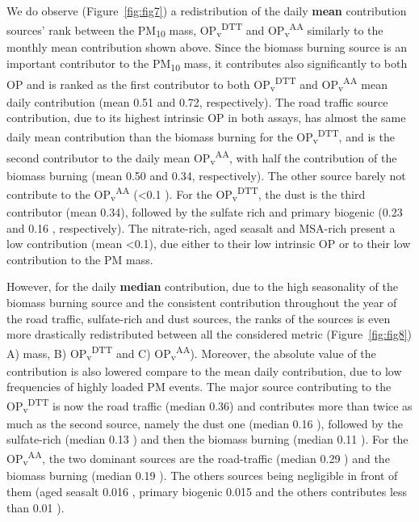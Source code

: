 \documentclass[
]{article}
\begin{document}
We do observe (Figure~\protect\hyperlink{fig:fig7}{{[}fig:fig7{]}}) a
redistribution of the daily \textbf{mean} contribution sources' rank
between the PM\textsubscript{10} mass,
OP\textsubscript{v}\textsuperscript{DTT} and
OP\textsubscript{v}\textsuperscript{AA} similarly to the monthly mean
contribution shown above. Since the biomass burning source is an
important contributor to the PM\textsubscript{10} mass, it contributes
also significantly to both OP and is ranked as the first contributor to
both OP\textsubscript{v}\textsuperscript{DTT} and
OP\textsubscript{v}\textsuperscript{AA} mean daily contribution (mean
0.51 and 0.72, respectively). The road traffic source contribution, due
to its highest intrinsic OP in both assays, has almost the same daily
mean contribution than the biomass burning for the
OP\textsubscript{v}\textsuperscript{DTT}, and is the second contributor
to the daily mean OP\textsubscript{v}\textsuperscript{AA}, with half the
contribution of the biomass burning (mean 0.50 and 0.34, respectively).
The other source barely not contribute to the
OP\textsubscript{v}\textsuperscript{AA} (\textless0.1 ). For the
OP\textsubscript{v}\textsuperscript{DTT}, the dust is the third
contributor (mean 0.34), followed by the sulfate rich and primary
biogenic (0.23 and 0.16 , respectively). The nitrate-rich, aged seasalt
and MSA-rich present a low contribution (mean \textless0.1), due either
to their low intrinsic OP or to their low contribution to the PM mass.

However, for the daily \textbf{median} contribution, due to the high
seasonality of the biomass burning source and the consistent
contribution throughout the year of the road traffic, sulfate-rich and
dust sources, the ranks of the sources is even more drastically
redistributed between all the considered metric
(Figure~\protect\hyperlink{fig:fig8}{{[}fig:fig8{]}}) A) mass, B)
OP\textsubscript{v}\textsuperscript{DTT} and C)
OP\textsubscript{v}\textsuperscript{AA}). Moreover, the absolute value
of the contribution is also lowered compare to the mean daily
contribution, due to low frequencies of highly loaded PM events. The
major source contributing to the
OP\textsubscript{v}\textsuperscript{DTT} is now the road traffic (median
0.36) and contributes more than twice as much as the second source,
namely the dust one (median 0.16 ), followed by the sulfate-rich (median
0.13 ) and then the biomass burning (median 0.11 ). For the
OP\textsubscript{v}\textsuperscript{AA}, the two dominant sources are
the road-traffic (median 0.29 ) and the biomass burning (median 0.19 ).
The others sources being negligible in front of them (aged seasalt 0.016
, primary biogenic 0.015 and the others contributes less than 0.01 ).
\end{document}
